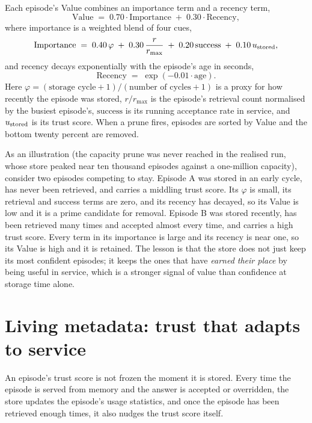 \begin{precise}
Each episode's Value combines an importance term and a recency term,
\[
  \text{Value} \;=\; 0.70\cdot\text{Importance} \;+\; 0.30\cdot\text{Recency},
\]
where importance is a weighted blend of four cues,
\[
  \text{Importance}
  \;=\;
  0.40\,\varphi \;+\; 0.30\,\frac{r}{r_{\max}} \;+\; 0.20\,\text{success} \;+\; 0.10\,u_{\text{stored}},
\]
and recency decays exponentially with the episode's age in seconds,
\[
  \text{Recency} \;=\; \exp(-0.01\cdot \text{age}).
\]
Here $\varphi = (\text{storage cycle} + 1)/(\text{number of cycles} + 1)$ is a proxy
for how recently the episode was stored, $r/r_{\max}$ is the episode's retrieval count
normalised by the busiest episode's, $\text{success}$ is its running acceptance rate
in service, and $u_{\text{stored}}$ is its trust score. When a prune fires, episodes are sorted
by Value and the bottom twenty percent are removed.
\end{precise}

\begin{workedexample}
As an illustration (the capacity prune was never reached in the realised run, whose
store peaked near ten thousand episodes against a one-million capacity),
consider two episodes competing to stay. Episode A was stored in an early cycle, has
never been retrieved, and carries a middling trust score. Its $\varphi$ is small, its
retrieval and success terms are zero, and its recency has decayed, so its Value is
low and it is a prime candidate for removal. Episode B was stored recently, has been
retrieved many times and accepted almost every time, and carries a high trust score.
Every term in its importance is large and its recency is near one, so its Value is
high and it is retained. The lesson is that the store does not just keep its most
confident episodes; it keeps the ones that have \emph{earned their place} by being
useful in service, which is a stronger signal of value than confidence at storage
time alone.
\end{workedexample}

\section{Living metadata: trust that adapts to service}
\label{sec:memory-feedback}

An episode's trust score is not frozen the moment it is stored. Every time the episode
is served from memory and the answer is accepted or overridden, the store updates the
episode's usage statistics, and once the episode has been retrieved enough times, it
also nudges the trust score itself.

